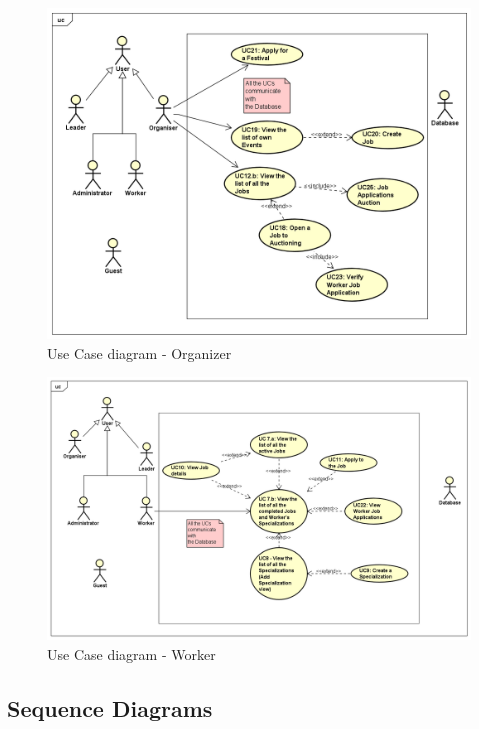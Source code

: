 				\begin{figure}[H]
					\includegraphics[width=\linewidth]{diagrams/NewUCD_Organizer.png}
					\caption{Use Case diagram - Organizer}
					\label{fig:uc_diag_2_organizer}
				\end{figure}
	
	
				\begin{figure}[H]
					\includegraphics[width=\linewidth]{diagrams/NewUCD_Worker.png}
					\caption{Use Case diagram - Worker}
					\label{fig:uc_diag_3_worker}
				\end{figure}
			
			\eject

			\subsection{Sequence Diagrams}
								
